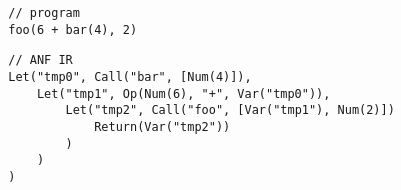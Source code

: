\begin{tcolorbox}
    \begin{verbatim}
        // program
        foo(6 + bar(4), 2)
    \end{verbatim}
    \tcblower
    \begin{verbatim}
        // ANF IR
        Let("tmp0", Call("bar", [Num(4)]),
            Let("tmp1", Op(Num(6), "+", Var("tmp0")),
                Let("tmp2", Call("foo", [Var("tmp1"), Num(2)])
                    Return(Var("tmp2"))
                )
            )
        )
    \end{verbatim}
\end{tcolorbox}




